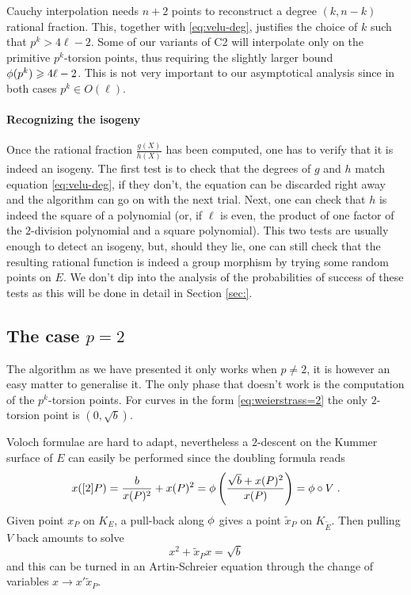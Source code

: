 Cauchy interpolation needs $n+2$ points to reconstruct a degree
$(k,n-k)$ rational fraction. This, together with \eqref{eq:velu-deg},
justifies the choice of $k$ such that $p^k > 4\ell - 2$. Some of our
variants of C2 will interpolate only on the primitive $p^k$-torsion
points, thus requiring the slightly larger bound $\phi(p^k) \geqslant
4\ell - 2$. This is not very important to our asymptotical analysis
since in both cases $p^k \in O(\ell)$.

\paragraph{Recognizing the isogeny}
Once the rational fraction $\frac{g(X)}{h(X)}$ has been computed, one
has to verify that it is indeed an isogeny. The first test is to check
that the degrees of $g$ and $h$ match equation \eqref{eq:velu-deg}, if
they don't, the equation can be discarded right away and the algorithm
can go on with the next trial. Next, one can check that $h$ is indeed
the square of a polynomial (or, if $\ell$ is even, the product of one
factor of the $2$-division polynomial and a square polynomial). This
two tests are usually enough to detect an isogeny, but, should they
lie, one can still check that the resulting rational function is
indeed a group morphism by trying some random points on $E$. We don't
dip into the analysis of the probabilities of success of these tests
as this will be done in detail in Section \ref{sec:}.


\subsection{The case $p=2$}
\label{sec:p=2}
The algorithm as we have presented it only works when $p\ne2$, it is
however an easy matter to generalise it. The only phase that doesn't
work is the computation of the $p^k$-torsion points. For curves in the
form \eqref{eq:weierstrass=2} the only $2$-torsion point is
$(0,\sqrt{b})$.

Voloch formulae are hard to adapt, nevertheless a $2$-descent on the
Kummer surface of $E$ can easily be performed since the doubling
formula reads
\begin{equation}
  x([2]P) = \frac{b}{x(P)^2} + x(P)^2 =
  \phi\left(\frac{\sqrt{b} + x(P)^2}{x(P)} \right) = \phi\circ V
  \;\text{.}
\end{equation}
Given point $x_P$ on $K_E$, a pull-back along $\phi$ gives a
point $\tilde{x}_P$ on $K_{\widetilde{E}}$. Then pulling $V$ back
amounts to solve
\begin{equation}
  \label{eq:2-descent}
  x^2 + \tilde{x}_Px = \sqrt{b}
\end{equation}
and this can be turned in an Artin-Schreier equation through the
change of variables $x \rightarrow x'\tilde{x}_P$.

